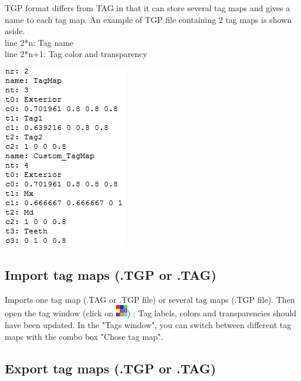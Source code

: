 \begin{minipage}{0.55\textwidth}
TGP format differs from TAG in that it can store several tag maps and gives a name to each tag map. An example of TGP file containing 2 tag maps is shown aside.\\
line 2*n: Tag name\\
line 2*n+1: Tag color and transparency
\end{minipage}  
 \begin{minipage}{0.45\textwidth}\centering
  \includegraphics[scale=0.5]{images/07/tagmaps/TGP_file.png}
 \end{minipage} 

\noindent



\subsection{Import tag maps (.TGP or .TAG)}
Imports one tag map (.TAG or .TGP file) or several tag maps (.TGP file). Then open the tag window (click on \includegraphics[scale=0.7]{images/07/tagmaps/tagmaps.png}) : Tag labels, colors and transparencies should have been updated. In the "Tags window", you can switch between different tag maps with the combo box "Chose tag map".

\subsection{Export tag maps (.TGP or .TAG)}

